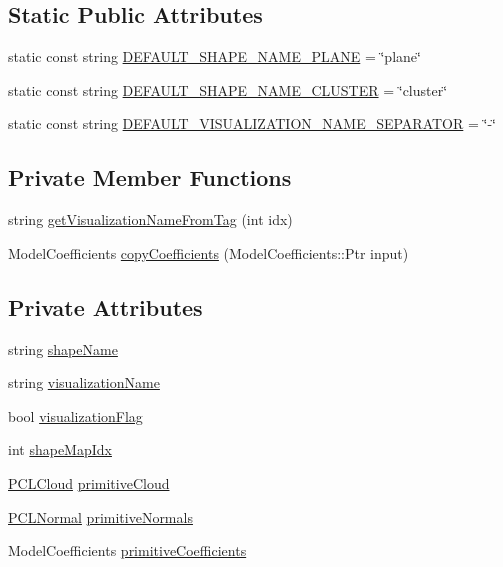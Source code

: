 \subsection*{Static Public Attributes}
\begin{DoxyCompactItemize}
\item 
static const string \hyperlink{classpcp_1_1PCPrimitive_a640bb9e84b55d900e6edbaef8b938d6e}{D\-E\-F\-A\-U\-L\-T\-\_\-\-S\-H\-A\-P\-E\-\_\-\-N\-A\-M\-E\-\_\-\-P\-L\-A\-N\-E} = \char`\"{}plane\char`\"{}
\item 
static const string \hyperlink{classpcp_1_1PCPrimitive_ab54a8fb25b750b3808d652f25161ba02}{D\-E\-F\-A\-U\-L\-T\-\_\-\-S\-H\-A\-P\-E\-\_\-\-N\-A\-M\-E\-\_\-\-C\-L\-U\-S\-T\-E\-R} = \char`\"{}cluster\char`\"{}
\item 
static const string \hyperlink{classpcp_1_1PCPrimitive_a9dc28983a955e1f9b1813a15e4260386}{D\-E\-F\-A\-U\-L\-T\-\_\-\-V\-I\-S\-U\-A\-L\-I\-Z\-A\-T\-I\-O\-N\-\_\-\-N\-A\-M\-E\-\_\-\-S\-E\-P\-A\-R\-A\-T\-O\-R} = \char`\"{}-\/\char`\"{}
\end{DoxyCompactItemize}
\subsection*{Private Member Functions}
\begin{DoxyCompactItemize}
\item 
string \hyperlink{classpcp_1_1PCPrimitive_a0764e20850fd7392f657d1cc43e8ec77}{get\-Visualization\-Name\-From\-Tag} (int idx)
\item 
Model\-Coefficients \hyperlink{classpcp_1_1PCPrimitive_a2d8fe7d2a3a6454cb378bdbbff408cf0}{copy\-Coefficients} (Model\-Coefficients\-::\-Ptr input)
\end{DoxyCompactItemize}
\subsection*{Private Attributes}
\begin{DoxyCompactItemize}
\item 
string \hyperlink{classpcp_1_1PCPrimitive_a120d0dd6120b9fe1af74d698d40adb1c}{shape\-Name}
\item 
string \hyperlink{classpcp_1_1PCPrimitive_a8ac9332a85fb342e957959c97012f4d3}{visualization\-Name}
\item 
bool \hyperlink{classpcp_1_1PCPrimitive_a44cc3f58388966da71e1b07b52d3081c}{visualization\-Flag}
\item 
int \hyperlink{classpcp_1_1PCPrimitive_a809c274d155e9b552cf02a0687b7cc11}{shape\-Map\-Idx}
\item 
\hyperlink{pc__primitive_8h_a02a7c0cdfcd324f1b5b87ce549fdbe10}{P\-C\-L\-Cloud} \hyperlink{classpcp_1_1PCPrimitive_accdf8a12234519275d4276b6706d4703}{primitive\-Cloud}
\item 
\hyperlink{pc__primitive_8h_abe81b5e6ffcc0ceb1b95b0489419027d}{P\-C\-L\-Normal} \hyperlink{classpcp_1_1PCPrimitive_a96359fda0d8c70e3b074d97bde90b282}{primitive\-Normals}
\item 
Model\-Coefficients \hyperlink{classpcp_1_1PCPrimitive_adb0f70b618dddbff203bccd1fa071782}{primitive\-Coefficients}
\end{DoxyCompactItemize}


